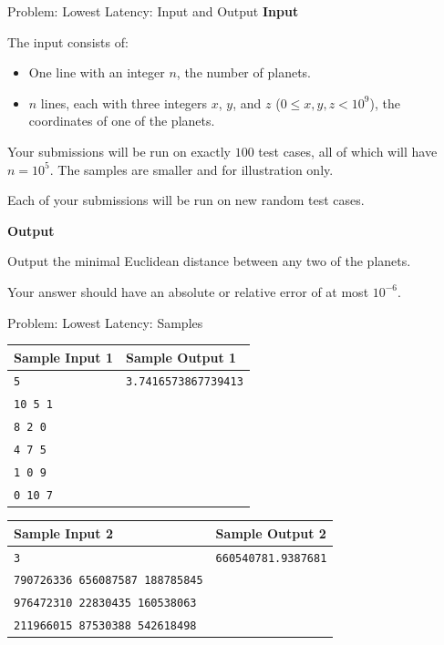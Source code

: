 \documentclass[11pt,pdf, aspectratio=169]{beamer}
\begin{document}
  \begin{frame}{Problem: Lowest Latency: Input and Output}
    \textbf{Input}

    The input consists of:
    \begin{itemize}
      \item One line with an integer $n$, the number of planets.
      \item $n$ lines, each with three integers $x$, $y$, and $z$
      ($0 \leq x, y, z < 10^9$), the coordinates of one of the planets.
    \end{itemize}
    Your submissions will be run on exactly $100$ test cases, all of which will have $n = 10^5$.
    The samples are smaller and for illustration only.

    Each of your submissions will be run on new random test cases.

    \textbf{Output}

    Output the minimal Euclidean distance between any two of the planets.

    Your answer should have an absolute or relative error of at most $10^{-6}$.
  \end{frame}
  \begin{frame}{Problem: Lowest Latency: Samples}
    \begin{tabular}{|l|l|}
      \hline
      \textbf{Sample Input 1} & \textbf{Sample Output 1}    \\
      \hline
      \texttt{5}              & \texttt{3.7416573867739413} \\
      \texttt{10 5 1}         &                             \\
      \texttt{8 2 0}          &                             \\
      \texttt{4 7 5}          &                             \\
      \texttt{1 0 9}          &                             \\
      \texttt{0 10 7}         &                             \\
      \hline
    \end{tabular}

    \begin{tabular}{|l|l|}
      \hline
      \textbf{Sample Input 2}                & \textbf{Sample Output 2}   \\
      \hline
      \texttt{3}                             & \texttt{660540781.9387681} \\
      \texttt{790726336 656087587 188785845} &                            \\
      \texttt{976472310 22830435 160538063}  &                            \\
      \texttt{211966015 87530388 542618498}  &                            \\
      \hline
    \end{tabular}

  \end{frame}
\end{document}
